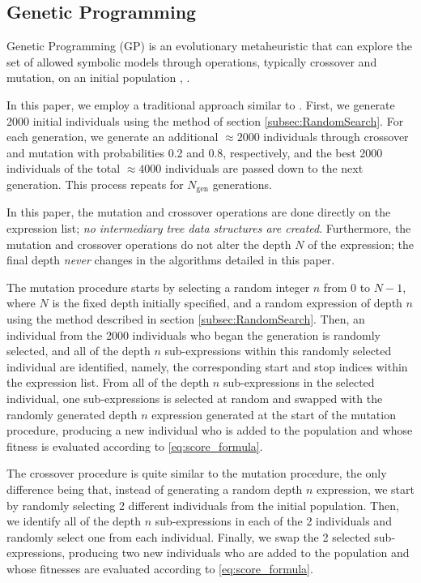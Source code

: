 \documentclass[runningheads]{llncs}
\begin{document}
\subsection{Genetic Programming} \label{subsec:GeneticProgramming}
Genetic Programming (GP) is an evolutionary metaheuristic that can explore the set of allowed symbolic models through operations, typically crossover and mutation, on an initial population \cite{manti2023discovering} \cite{PoliFieldGuideGP}, \cite{Koza1994}.
\par In this paper, we employ a traditional approach similar to \cite{manti2023discovering}. First, we generate 2000 initial individuals using the method of section \ref{subsec:RandomSearch}. For each generation, we generate an additional $\approx 2000$ individuals through crossover and mutation with probabilities 0.2 and 0.8, respectively, and the best 2000 individuals of the total $\approx 4000$ individuals are passed down to the next generation. This process repeats for $N_{\mathrm{gen}}$ generations.
\par In this paper, the mutation and crossover operations are done directly on the expression list; \emph{no intermediary tree data structures are created}. Furthermore, the mutation and crossover operations do not alter the depth $N$ of the expression; the final depth \emph{never} changes in the algorithms detailed in this paper. 
\par The mutation procedure starts by selecting a random integer $n$ from $0$ to $N-1$, where $N$ is the fixed depth initially specified, and a random expression of depth $n$ using the method described in section \ref{subsec:RandomSearch}. Then, an individual from the 2000 individuals who began the generation is randomly selected, and all of the depth $n$ sub-expressions within this randomly selected individual are identified, namely, the corresponding start and stop indices within the expression list. From all of the depth $n$ sub-expressions in the selected individual, one sub-expressions is selected at random and swapped with the randomly generated depth $n$ expression generated at the start of the mutation procedure, producing a new individual who is added to the population and whose fitness is evaluated according to \ref{eq:score_formula}.
\par The crossover procedure is quite similar to the mutation procedure, the only difference being that, instead of generating a random depth $n$ expression, we start by randomly selecting 2 different individuals from the initial population. Then, we identify all of the depth $n$ sub-expressions in each of the 2 individuals and randomly select one from each individual. Finally, we swap the 2 selected sub-expressions, producing two new individuals who are added to the population and whose fitnesses are evaluated according to \ref{eq:score_formula}.
\end{document}

